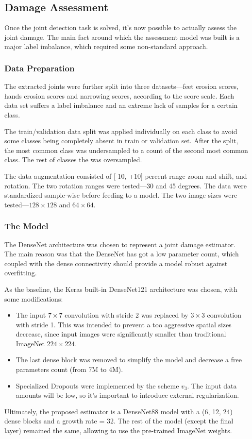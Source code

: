 \documentclass[thesis=B,english]{FITthesis}[2019/12/23]
\begin{document}
\subsection{Damage Assessment}

Once the joint detection task is solved, it's now possible to actually assess the joint damage. The main fact around which the assessment model was built is a major label imbalance, which required some non-standard approach.

\subsubsection{Data Preparation}

The extracted joints were further split into three datasets---feet erosion scores, hands erosion scores and narrowing scores, according to the score scale. Each data set suffers a label imbalance and an extreme lack of samples for a certain class.

The train/validation data split was applied individually on each class to avoid some classes being completely absent in train or validation set. After the split, the most common class was undersampled to a count of the second most common class. The rest of classes the was oversampled.

The data augmentation consisted of [-10, +10] percent range zoom and shift, and rotation. The two rotation ranges were tested---30 and 45 degrees. The data were standardized sample-wise before feeding to a model. The two image sizes were tested---$128 \times 128$ and $64 \times 64$.

\subsubsection{The Model}

The DenseNet architecture was chosen to represent a joint damage estimator. The main reason was that the DenseNet has got a low parameter count, which coupled with the dense connectivity should provide a model robust against overfitting.

As the baseline, the Keras built-in DenseNet121 architecture was chosen, with some modifications:

\begin{itemize}
	\item The input $7 \times 7$ convolution with stride 2 was replaced by $3 \times 3$ convolution with stride 1. This was intended to prevent a too aggressive spatial sizes decrease, since input images were significantly smaller than traditional ImageNet $224 \times 224$.
	\item The last dense block was removed to simplify the model and decrease a free parameters count (from 7M to 4M).
	\item Specialized Dropouts\cite{specialized_dropouts} were implemented by the scheme $v_3$. The input data amounts will be low, so it's important to introduce external regularization.
\end{itemize}
Ultimately, the proposed estimator is a DenseNet88 model with a (6, 12, 24) dense blocks and a growth rate = 32. The rest of the model (except the final layer) remained the same, allowing to use the pre-trained ImageNet weights.
\end{document}
